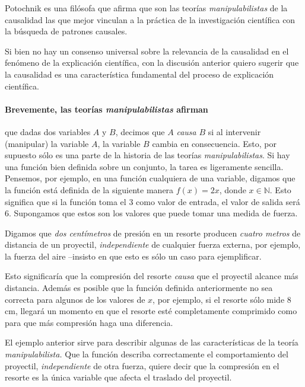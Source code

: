     

Potochnik es una filósofa que afirma que son las teorías \emph
{manipulabilistas} \parencite{sep-causation-mani} de la causalidad
las que mejor vinculan a la práctica de la investigación científica
con la búsqueda de patrones causales.

Si bien no hay un consenso universal sobre la relevancia de la
causalidad en el fenómeno de la explicación científica, con la
discusión anterior quiero sugerir que la causalidad
es una característica fundamental del proceso de explicación 
científica.

\paragraph{Brevemente, las teorías \emph{manipulabilistas} afirman} que dadas dos variables $A$ y $B$, decimos que $A$ \emph{causa} $B$ si al intervenir (manipular) la variable $A$, la variable $B$ cambia en consecuencia.
Esto, por supuesto sólo es una parte de la historia de las teorías
\emph{manipulabilistas}. Si hay una función bien definida sobre un
conjunto, la tarea es ligeramente sencilla. Pensemos, por ejemplo,
en una función cualquiera de una variable, digamos que la función
está definida de la siguiente manera $f(x) = 2x$, donde $x \in \mathbb
{N}$. Esto significa que si la función toma el $3$ como valor de
entrada, el valor de salida será $6$. Supongamos que estos son los
valores que puede tomar una medida de fuerza.

Digamos que \emph{dos centímetros} de presión en un resorte producen
\emph{cuatro metros} de distancia de un proyectil, \emph{independiente
} de cualquier fuerza externa, por ejemplo, la fuerza del aire
--insisto en que esto es sólo un caso para ejemplificar.

Esto significaría que la compresión del resorte \emph{causa} que el proyectil alcance más distancia.
Además es posible que la función definida anteriormente no sea correcta para algunos de los valores de $x$, por ejemplo, si el resorte sólo mide $8$ cm, llegará un momento en que el resorte esté completamente comprimido como para que más compresión haga una diferencia.

El ejemplo anterior sirve para describir algunas de las características de la teoría \emph{manipulabilista.}
Que la función describa correctamente el comportamiento del proyectil, \emph{independiente} de otra fuerza, quiere decir que la compresión en el resorte es la única variable que afecta el traslado del proyectil.

